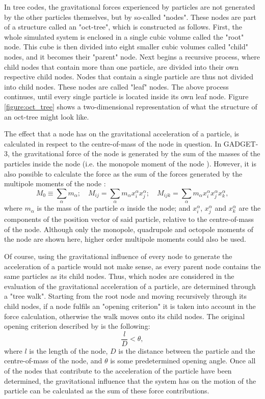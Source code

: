 \documentclass[english, oneside]{HYgradu}
\begin{document}
In tree codes, the gravitational forces experienced by particles are not generated by the other particles themselves, but by so-called "nodes". These nodes are part of a structure called an "oct-tree", which is constructed as follows. First, the whole simulated system is enclosed in a single cubic volume called the "root" node. This cube is then divided into eight smaller cubic volumes called "child" nodes, and it becomes their "parent" node. Next begins a recursive process, where child nodes that contain more than one particle, are divided into their own respective child nodes. Nodes that contain a single particle are thus not divided into child nodes. These nodes are called "leaf" nodes. The above process continues, until every single particle is located inside its own leaf node. Figure \ref{figure:oct_tree} shows a two-dimensional representation of what the structure of an oct-tree might look like.

The effect that a node has on the gravitational acceleration of a particle, is calculated in respect to the centre-of-mass of the node in question. In GADGET-3, the gravitational force of the node is generated by the sum of the masses of the particles inside the node (i.e. the monopole moment of the node \citealt{Springel2005}). However, it is also possible to calculate the force as the sum of the forces generated by the multipole moments of the node \citep{BinneyTremaine}:
\begin{equation}
M_0 \equiv \displaystyle\sum_\alpha m_\alpha; \quad M_{ij} = \displaystyle\sum_\alpha m_\alpha x^\alpha_i x^\alpha_j; \quad M_{ijk} = \displaystyle\sum_\alpha m_\alpha x^\alpha_i x^\alpha_j x^\alpha_k,
\end{equation}
where $m_\alpha$ is the mass of the particle $\alpha$ inside the node; and $x_i^\alpha$, $x_j^\alpha$ and $x_k^\alpha$ are the components of the position vector of said particle, relative to the centre-of-mass of the node. Although only the monopole, quadrupole and octopole moments of the node are shown here, higher order multipole moments could also be used.

Of course, using the gravitational influence of every node to generate the acceleration of a particle would not make sense, as every parent node contains the same particles as its child nodes. Thus, which nodes are considered in the evaluation of the gravitational acceleration of a particle, are determined through a "tree walk". Starting from the root node and moving recursively through its child nodes, if a node fulfils an "opening criterion" it is taken into account in the force calculation, otherwise the walk moves onto its child nodes. The original opening criterion described by \cite{Barnes1986} is the following:
\begin{equation}
\frac{l}{D} < \theta,
\end{equation}
where $l$ is the length of the node, $D$ is the distance between the particle and the centre-of-mass of the node, and $\theta$ is some predetermined opening angle. Once all of the nodes that contribute to the acceleration of the particle have been determined, the gravitational influence that the system has on the motion of the particle can be calculated as the sum of these force contributions.
\end{document}
